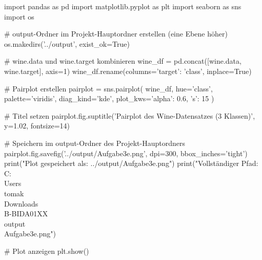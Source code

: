 import pandas as pd
import matplotlib.pyplot as plt
import seaborn as sns
import os

# output-Ordner im Projekt-Hauptordner erstellen (eine Ebene höher)
os.makedirs('../output', exist_ok=True)

# wine.data und wine.target kombinieren
wine_df = pd.concat([wine.data, wine.target], axis=1)
wine_df.rename(columns={'target': 'class'}, inplace=True)

# Pairplot erstellen
pairplot = sns.pairplot(
    wine_df,
    hue='class',
    palette='viridis',
    diag_kind='kde',
    plot_kws={'alpha': 0.6, 's': 15}
)

# Titel setzen
pairplot.fig.suptitle('Pairplot des Wine-Datensatzes (3 Klassen)', y=1.02, fontsize=14)

# Speichern im output-Ordner des Projekt-Hauptordners
pairplot.fig.savefig('../output/Aufgabe3e.png', dpi=300, bbox_inches='tight')
print("Plot gespeichert als: ../output/Aufgabe3e.png")
print("Vollständiger Pfad: C:\\Users\\tomak\\Downloads\\B-BIDA01XX\\output\\Aufgabe3e.png")

# Plot anzeigen
plt.show()